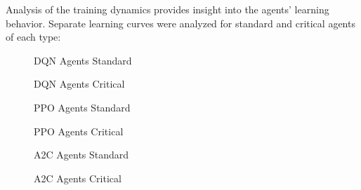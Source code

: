 Analysis of the training dynamics provides insight into the agents' learning behavior. Separate learning curves were analyzed for standard and critical agents of each type:

\begin{figure}[h]
\centering
\fbox{\rule{0pt}{1.5in}\rule{0.9\linewidth}{0pt}}
\caption{DQN Agents Standard}
\label{fig:dqn_standard}
\end{figure}

\begin{figure}[h]
\centering
\fbox{\rule{0pt}{1.5in}\rule{0.9\linewidth}{0pt}}
\caption{DQN Agents Critical}
\label{fig:dqn_critical}
\end{figure}

\begin{figure}[h]
\centering
\fbox{\rule{0pt}{1.5in}\rule{0.9\linewidth}{0pt}}
\caption{PPO Agents Standard}
\label{fig:ppo_standard}
\end{figure}

\begin{figure}[h]
\centering
\fbox{\rule{0pt}{1.5in}\rule{0.9\linewidth}{0pt}}
\caption{PPO Agents Critical}
\label{fig:ppo_critical}
\end{figure}

\begin{figure}[h]
\centering
\fbox{\rule{0pt}{1.5in}\rule{0.9\linewidth}{0pt}}
\caption{A2C Agents Standard}
\label{fig:a2c_standard}
\end{figure}

\begin{figure}[h]
\centering
\fbox{\rule{0pt}{1.5in}\rule{0.9\linewidth}{0pt}}
\caption{A2C Agents Critical}
\label{fig:a2c_critical}
\end{figure}


